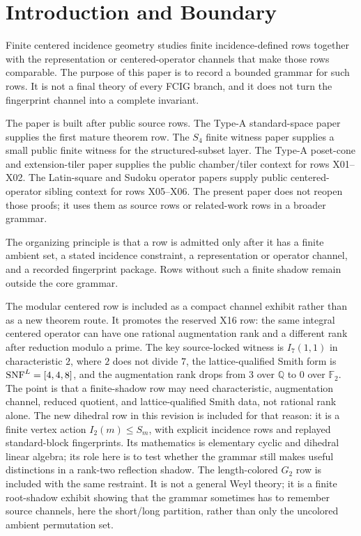\section{Introduction and Boundary}

Finite centered incidence geometry studies finite incidence-defined rows together with the representation or centered-operator channels that make those rows comparable.  The purpose of this paper is to record a bounded grammar for such rows.  It is not a final theory of every FCIG branch, and it does not turn the fingerprint channel into a complete invariant.

The paper is built after public source rows.  The Type-A standard-space paper supplies the first mature theorem row\cite{BabanskyyTypeAFCIG2026}.  The \(S_4\) finite witness paper supplies a small public finite witness for the structured-subset layer\cite{BabanskyyS4Layer2026}.  The Type-A poset-cone and extension-tiler paper supplies the public chamber/tiler context for rows X01--X02\cite{BabanskyyTypeAPoset2026}.  The Latin-square and Sudoku operator papers supply public centered-operator sibling context for rows X05--X06\cite{BabanskyyLatin2026,BabanskyySudokuOperators2026}.  The present paper does not reopen those proofs; it uses them as source rows or related-work rows in a broader grammar.

The organizing principle is that a row is admitted only after it has a finite ambient set, a stated incidence constraint, a representation or operator channel, and a recorded fingerprint package.  Rows without such a finite shadow remain outside the core grammar.

The modular centered row is included as a compact channel exhibit rather than as a new theorem route.  It promotes the reserved X16 row: the same integral centered operator can have one rational augmentation rank and a different rank after reduction modulo a prime.  The key source-locked witness is \(I_7(1,1)\) in characteristic \(2\), where \(2\) does not divide \(7\), the lattice-qualified Smith form is \(\operatorname{SNF}^{L}=[4,4,8]\), and the augmentation rank drops from \(3\) over \(\mathbb Q\) to \(0\) over \(\mathbb F_2\).  The point is that a finite-shadow row may need characteristic, augmentation channel, reduced quotient, and lattice-qualified Smith data, not rational rank alone.  The new dihedral row in this revision is included for that reason: it is a finite vertex action \(I_2(m)\leq S_m\), with explicit incidence rows and replayed standard-block fingerprints.  Its mathematics is elementary cyclic and dihedral linear algebra\cite{BjornerBrenti2005}; its role here is to test whether the grammar still makes useful distinctions in a rank-two reflection shadow.  The length-colored \(G_2\) row is included with the same restraint.  It is not a general Weyl theory; it is a finite root-shadow exhibit showing that the grammar sometimes has to remember source channels, here the short/long partition, rather than only the uncolored ambient permutation set.

